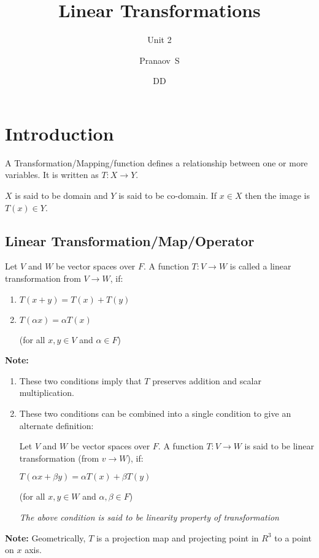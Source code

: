 \documentclass[english,course,fleqn]{lecture}
\title{Linear Transformations}
\subtitle{Unit 2}
\author{Pranaov\ S}
\date{DD}{MM}{YYYY}
\begin{document}
\newpage

\section{Introduction}

A Transformation/Mapping/function defines a relationship between one or more variables.
It is written as $T:X\rightarrow Y$.

$X$ is said to be domain and $Y$ is said to be co-domain.
If $x \in X$ then the image is $T(x)\in Y$.

\subsection{Linear Transformation/Map/Operator}

\begin{definition}[Transformation]
	Let $V$ and $W$ be vector spaces over $F$.
	A function $T:V \rightarrow W$ is called a linear transformation from $V \rightarrow W$, if:

	\begin{enumerate}
		\item $T(x+y) = T(x) + T(y)$
		\item $T(\alpha x) = \alpha T(x)$

		      (for all $x,y \in V$ and $\alpha \in F$)
	\end{enumerate}
\end{definition}

\textbf{Note:}
\begin{enumerate}
	\item These two conditions imply that $T$ preserves addition and scalar multiplication.
	\item These two conditions can be combined into a single condition to give an alternate definition:

	      Let $V$ and $W$ be vector spaces over $F$.
	      A function $T:V \rightarrow W$ is said to be linear transformation (from $v \rightarrow W$), if:

	      $T(\alpha x + \beta y) = \alpha T(x) + \beta T(y)$

	      (for all $x,y \in W$ and $\alpha,\beta \in F$)

	      \textit{The above condition is said to be linearity property of transformation}

\end{enumerate}

\textbf{Note:} Geometrically, $T$ is a projection map and projecting point in $R^{3}$ to a point on $x$ axis.
\end{document}
